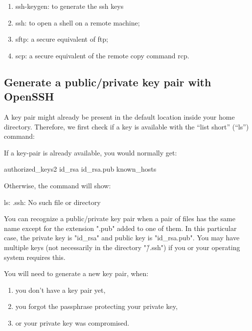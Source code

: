   \begin{enumerate}
    \item  ssh-keygen: to generate the ssh keys
    \item  ssh: to open a shell on a remote machine;
    \item  sftp: a secure equivalent of ftp;
    \item  scp: a secure equivalent of the remote copy command rcp.
  \end{enumerate}

  \subsection{Generate a public/private key pair with OpenSSH}
  \label{subsec:generate-key-pair-with-openssh}

  A key pair might already be present in the default location inside your home
  directory. Therefore, we first check if a key is available with the ``list
  short'' (``ls'')  command:

  \begin{prompt}
  $ %
  \end{prompt}


  If a key-pair is already available, you would normally get:
  \begin{prompt}
  authorized\_keys2    id\_rsa            id\_rsa.pub         known\_hosts
  \end{prompt}

  Otherwise, the command will show:

  \begin{prompt}
  ls: .ssh: No such file or directory
  \end{prompt}

  You can recognize a public/private key pair when a pair of files has the same
  name except for the extension ".pub" added to one of them. In this particular
  case, the private key is "id\_rsa" and public key is "id\_rsa.pub". You may
  have multiple keys (not necessarily in the directory "\~/.ssh") if you or
  your operating system requires this.

  You will need to generate a new key pair, when:
  \begin{enumerate}
    \item  you don't have a key pair yet,
    \item  you forgot the passphrase protecting your private key,
    \item  or your private key was compromised.
  \end{enumerate}

